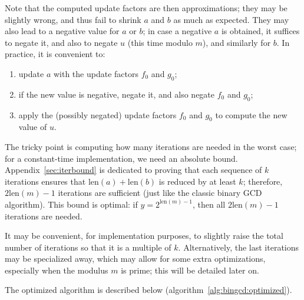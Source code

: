 \documentclass{llncs}
\newcommand{\bitlength}{\text{len}}
\begin{document}
Note that the computed update factors are then approximations; they may
be slightly wrong, and thus fail to shrink $a$ and $b$ as much as
expected. They may also lead to a negative value for $a$ or $b$; in
case a negative $a$ is obtained, it suffices to negate it, and also to
negate $u$ (this time modulo $m$), and similarly for $b$. In practice,
it is convenient to:
\begin{enumerate}
    \item update $a$ with the update factors $f_0$ and $g_0$;
    \item if the new value is negative, negate it, and also negate
    $f_0$ and $g_0$;
    \item apply the (possibly negated) update factors $f_0$ and $g_0$
    to compute the new value of $u$.
\end{enumerate}

The tricky point is computing how many iterations are needed in the
worst case; for a constant-time implementation, we need an absolute
bound. Appendix~\ref{sec:iterbound} is dedicated to proving that each
sequence of $k$ iterations ensures that $\bitlength(a) + \bitlength(b)$
is reduced by at least $k$; therefore, $2\bitlength(m)-1$ iterations are
sufficient (just like the classic binary GCD algorithm). This bound
is optimal: if $y = 2^{\bitlength(m)-1}$, then all $2\bitlength(m)-1$
iterations are needed.

It may be convenient, for implementation purposes, to slightly raise the
total number of iterations so that it is a multiple of $k$.
Alternatively, the last iterations may be specialized away, which may
allow for some extra optimizations, especially when the modulus $m$ is
prime; this will be detailed later on.

The optimized algorithm is described below
(algorithm~\ref{alg:bingcd:optimized}).
\end{document}
